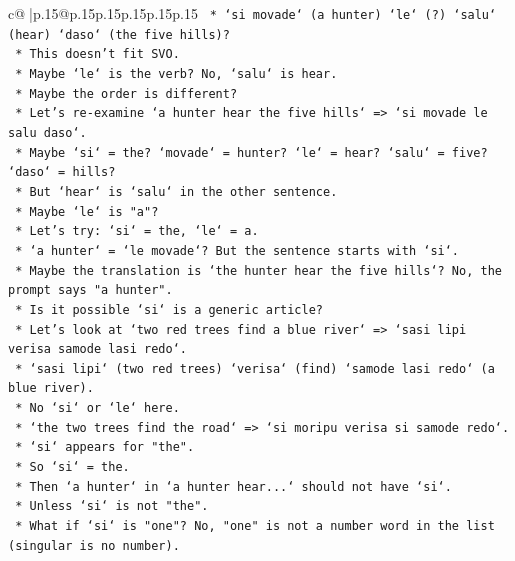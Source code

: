 \documentclass{article}
\begin{document}
{\begin{supertabular}{c@{$\;$}|p{.15\linewidth}@{}p{.15\linewidth}p{.15\linewidth}p{.15\linewidth}p{.15\linewidth}p{.15\linewidth}}
{{{\texttt{                *   `si movade` (a hunter) `le` (?) `salu` (hear) `daso` (the five hills)?} \\
\texttt{                *   This doesn't fit SVO.} \\
\texttt{                *   Maybe `le` is the verb? No, `salu` is hear.} \\
\texttt{                *   Maybe the order is different?} \\
\texttt{                *   Let's re{-}examine `a hunter hear the five hills` => `si movade le salu daso`.} \\
\texttt{                *   Maybe `si` = the? `movade` = hunter? `le` = hear? `salu` = five? `daso` = hills?} \\
\texttt{                *   But `hear` is `salu` in the other sentence.} \\
\texttt{                *   Maybe `le` is "a"?} \\
\texttt{                *   Let's try: `si` = the, `le` = a.} \\
\texttt{                *   `a hunter` = `le movade`? But the sentence starts with `si`.} \\
\texttt{                *   Maybe the translation is `the hunter hear the five hills`? No, the prompt says "a hunter".} \\
\texttt{                *   Is it possible `si` is a generic article?} \\
\texttt{                *   Let's look at `two red trees find a blue river` => `sasi lipi verisa samode lasi redo`.} \\
\texttt{                *   `sasi lipi` (two red trees) `verisa` (find) `samode lasi redo` (a blue river).} \\
\texttt{                *   No `si` or `le` here.} \\
\texttt{                *   `the two trees find the road` => `si moripu verisa si samode redo`.} \\
\texttt{                *   `si` appears for "the".} \\
\texttt{                *   So `si` = the.} \\
\texttt{                *   Then `a hunter` in `a hunter hear...` should not have `si`.} \\
\texttt{                *   Unless `si` is not "the".} \\
\texttt{                *   What if `si` is "one"? No, "one" is not a number word in the list (singular is no number).} \\
}}}
\end{supertabular}}
\end{document}
